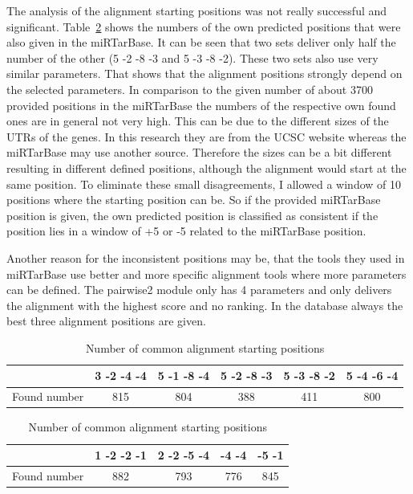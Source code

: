 \documentclass[12pt]{article}
\begin{document}
The analysis of the alignment starting positions was not really successful and significant. Table~\ref{tab:positions} shows the numbers of the own predicted positions that were also given in the miRTarBase. It can be seen that two sets deliver only half the number of the other (5 -2 -8 -3 and 5 -3 -8 -2). These two sets also use very similar parameters. That shows that the alignment positions strongly depend on the selected parameters. In comparison to the given number of about 3700 provided positions in the miRTarBase the numbers of the respective own found ones are in general not very high. This can be due to the different sizes of the UTRs of the genes. In this research they are from the UCSC website whereas the miRTarBase may use another source. Therefore the sizes can be a bit different resulting in different defined positions, although the alignment would start at the same position. To eliminate these small disagreements, I allowed a window of 10 positions where the starting position can be. So if the provided miRTarBase position is given, the own predicted position is classified as consistent if the position lies in a window of +5 or -5 related to the miRTarBase position. 

Another reason for the inconsistent positions may be, that the tools they used in miRTarBase use better and more specific alignment tools where more parameters can be defined. The pairwise2 module only has 4 parameters and only delivers the alignment with the highest score and no ranking. In the database always the best three alignment positions are given.  \\


\begin{table}
\caption{Number of common alignment starting positions}
\vspace{0.3cm}
\begin{tabular}{c||c|c|c|c|c} 
& 3 -2 -4 -4 & 5 -1 -8 -4 & 5 -2 -8 -3 & 5 -3 -8 -2 & 5 -4 -6 -4  \\
\hline\hline
Found number & 815 & 804 & 388 & 411 & 800\\
\hline
\end{tabular}
\vspace{0.5cm}

\begin{tabular}{c||c|c|c|c}
& 1 -2 -2 -1 & 2 -2 -5 -4 & -4 -4 & -5 -1 \\
\hline\hline
Found number & 882 & 793 & 776 & 845  \\
\hline
\end{tabular}
\label{tab:positions}
\end{table}
\end{document}

